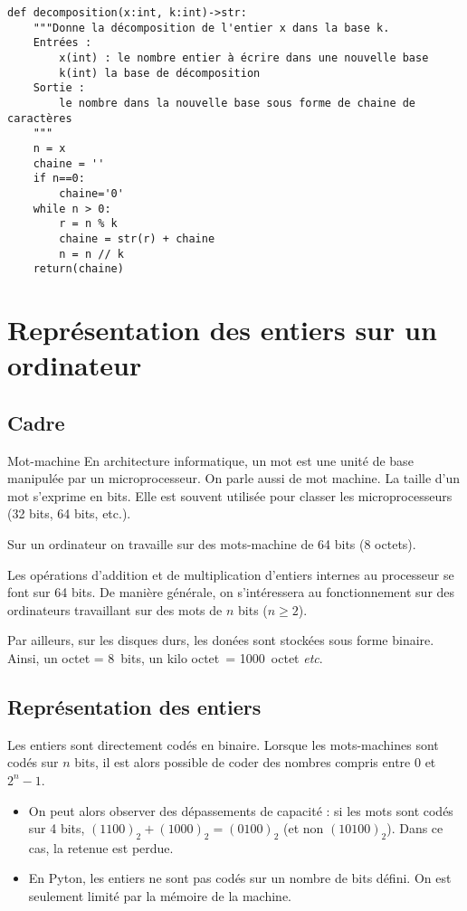 \begin{lstlisting}
def decomposition(x:int, k:int)->str:
    """Donne la décomposition de l'entier x dans la base k.
    Entrées :
        x(int) : le nombre entier à écrire dans une nouvelle base
        k(int) la base de décomposition
    Sortie :
        le nombre dans la nouvelle base sous forme de chaine de caractères
    """
    n = x
    chaine = ''
    if n==0:
        chaine='0'
    while n > 0:
        r = n % k
        chaine = str(r) + chaine
        n = n // k
    return(chaine)
\end{lstlisting}

\section{Représentation des entiers sur un ordinateur}
\subsection{Cadre}
\begin{defi}{Mot-machine}
En architecture informatique, un mot est une unité de base manipulée par un microprocesseur. On parle aussi de mot machine. La taille d’un mot s’exprime en bits. Elle est souvent utilisée pour classer les microprocesseurs (32 bits, 64 bits, etc.).
\end{defi}

Sur un ordinateur on travaille sur des mots-machine de 64 bits (8 octets).

Les opérations d’addition et de multiplication d’entiers internes au processeur se font sur 64 bits.
De manière générale, on s’intéressera au fonctionnement sur des ordinateurs travaillant sur des mots de $n$ bits
($n \geq 2$).


Par ailleurs, sur les disques durs, les donées sont stockées sous forme binaire. Ainsi, 
un octet = \SI{8}{bits}, un kilo octet~= \SI{1000}{octet} \textit{etc}.


\subsection{Représentation des entiers}
Les entiers sont directement codés en binaire. Lorsque les mots-machines sont codés sur $n$ bits, il est alors possible de coder des nombres compris entre 0 et $2^n-1$.
\begin{rem}
\begin{itemize}
\item On peut alors observer des dépassements de capacité : si les mots sont codés sur 4 bits, $(1100)_2 + (1000)_2 = (0100)_2$ (et non $(10100)_2$). Dans ce cas, la retenue est perdue. 
\item En Pyton, les entiers ne sont pas codés sur un nombre de bits défini. On est seulement limité par la mémoire de la machine.
\end{itemize}
\end{rem}
